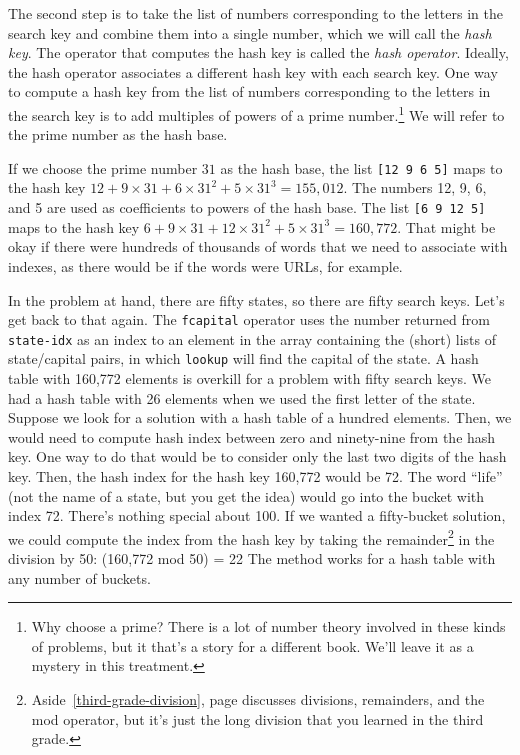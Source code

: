 The second step is to take the list of numbers corresponding
to the letters in the search key
and combine them into a single number, which we will call
the \emph{hash key}.
The operator that computes the hash key is called
the \emph{hash operator}.
Ideally, the hash operator associates a different hash key
with each search key.
One way to compute a hash key from the list of numbers
corresponding to the letters in the search key is
to add multiples of powers of a
prime number.\footnote{Why choose a prime?
There is a lot of number theory involved in these kinds
of problems, but it that's a story for a different book.
We'll leave it as a mystery in this treatment.}
We will refer to the prime number as the
hash base.

If we choose the prime number $31$
as the hash base, the list \texttt{[12 9 6 5]} maps to the hash key
$12 + 9\times31 + 6\times31^2 + 5\times31^3 = 155,012$.
The numbers 12, 9, 6, and 5 are used as coefficients to powers of
the hash base.
The list \texttt{[6 9 12 5]} maps to the hash key
$6 + 9\times31 + 12\times31^2 + 5\times31^3 = 160,772$.
That might be okay if there were hundreds of thousands of words
that we need to associate with indexes, as there would be
if the words were URLs, for example.

In the problem at hand, there are fifty states,
so there are fifty search keys.
Let's get back to that again.
The \texttt{fcapital} operator uses the
number returned from \texttt{state-idx} as an index to
an element in the array containing the (short) lists of
state/capital pairs, in which
\texttt{lookup} will find the capital of the state.
A hash table with 160,772 elements is overkill for
a problem with fifty search keys.
We had a hash table with 26 elements when we used the first letter of the state.
Suppose we look for a solution with a hash table of a hundred elements.
Then, we would need to compute hash index between zero and ninety-nine
from the hash key. One way to do that would be to
consider only the last two digits of the hash key.
Then, the hash index for the hash key 160,772 would be 72.
The word ``life'' (not the name of a state, but you get the idea)
would go into the bucket
with index 72.
There's nothing special about 100.
If we wanted a fifty-bucket solution,
we could compute the index from the hash key by taking the
remainder\footnote{Aside~\ref{third-grade-division},
page \pageref{third-grade-division} discusses
divisions, remainders, and the mod operator,
but it's just the long division that you learned in the third grade.}
in the division by 50: (160,772 mod 50) = 22
The method works for a hash table with any number of buckets.

